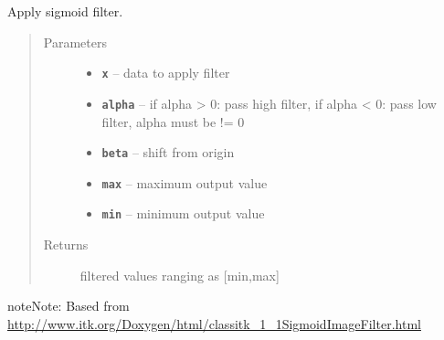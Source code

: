 \documentclass[letterpaper,10pt,english]{sphinxmanual}
\begin{document}
\begin{fulllineitems}
\label{RRtoolbox.lib.arrayops:RRtoolbox.lib.arrayops.filters.sigmoid}
Apply sigmoid filter.
\begin{quote}\begin{description}
\item[{Parameters}] \leavevmode\begin{itemize}
\item {} 
\textbf{\texttt{x}} -- data to apply filter

\item {} 
\textbf{\texttt{alpha}} -- if alpha \textgreater{} 0: pass high filter, if alpha \textless{} 0: pass low filter, alpha must be != 0

\item {} 
\textbf{\texttt{beta}} -- shift from origin

\item {} 
\textbf{\texttt{max}} -- maximum output value

\item {} 
\textbf{\texttt{min}} -- minimum output value

\end{itemize}

\item[{Returns}] \leavevmode
filtered values ranging as {[}min,max{]}

\end{description}\end{quote}

\begin{notice}{note}{Note:}
Based from \href{http://www.itk.org/Doxygen/html/classitk\_1\_1SigmoidImageFilter.html}{http://www.itk.org/Doxygen/html/classitk\_1\_1SigmoidImageFilter.html}
\end{notice}

\end{fulllineitems}

\end{document}
